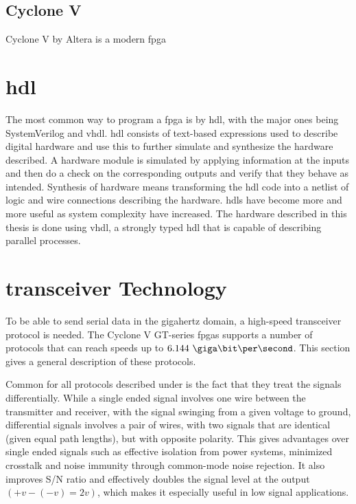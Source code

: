\documentclass[main.tex]{subfiles}
\begin{document}
\subsection{Cyclone V} \label{sec:cyclone}
Cyclone V by Altera is a modern \gls{fpga} 

\section{\gls{hdl}}
The most common way to program a \gls{fpga} is by \gls{hdl}, with the major ones being SystemVerilog and \acrshort{vhdl}. \Gls{hdl} consists of text-based expressions used to describe digital hardware and use this to further simulate and synthesize the hardware described. A hardware module is simulated by applying information at the inputs and then do a check on the corresponding outputs and verify that they behave as intended. Synthesis of hardware means transforming the \gls{hdl} code into a netlist of logic and wire connections describing the hardware. \glspl{hdl} have become more and more useful as system complexity have increased. \cite{weste11} The hardware described in this thesis is done using \acrshort{vhdl}, a strongly typed \gls{hdl} that is capable of describing parallel processes. 


\section{\Gls{transceiver} Technology}

To be able to send serial data in the gigahertz domain, a high-speed transceiver protocol is needed. The Cyclone V GT-series \glspl{fpga} supports a number of protocols that can reach speeds up to $6.144\ \giga\bit\per\second$. This section gives a general description of these protocols.

Common for all protocols described under is the fact that they treat the signals differentially. While a single ended signal involves one wire between the transmitter and receiver, with the signal swinging from a given voltage to ground, differential signals involves a pair of wires, with two signals that are identical (given equal path lengths), but with opposite polarity. This gives advantages over single ended signals such as effective isolation from power systems, minimized crosstalk and noise immunity through common-mode noise rejection. It also improves S/N ratio and effectively doubles the signal level at the output $(+v - (-v) = 2v)$, which makes it especially useful in low signal applications.\cite{douglas01}
\end{document}
